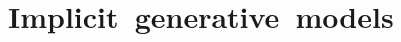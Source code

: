\chapter{\mbox{Implicit generative models}}\label{ch:differentiable-generative-models}

%
%
%
%
%
%
%
%
%
%
